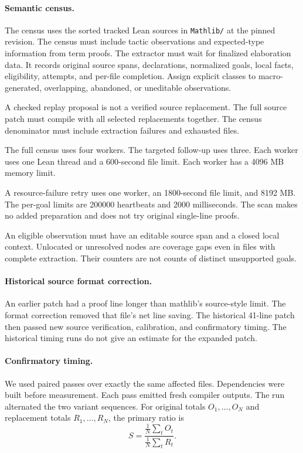\paragraph{Semantic census.}
The census uses the sorted tracked Lean sources in \texttt{Mathlib/} at the pinned revision.
The census must include tactic observations and expected-type information from term proofs.
The extractor must wait for finalized elaboration data.
It records original source spans, declarations, normalized goals, local facts, eligibility, attempts, and per-file completion.
Assign explicit classes to macro-generated, overlapping, abandoned, or uneditable observations.

A checked replay proposal is not a verified source replacement.
The full source patch must compile with all selected replacements together.
The census denominator must include extraction failures and exhausted files.

The full census uses four workers.
The targeted follow-up uses three.
Each worker uses one Lean thread and a 600-second file limit.
Each worker has a 4096 MB memory limit.

A resource-failure retry uses one worker, an 1800-second file limit, and 8192 MB.
The per-goal limits are 200000 heartbeats and 2000 milliseconds.
The scan makes no added preparation and does not try original single-line proofs.

An eligible observation must have an editable source span and a closed local context.
Unlocated or unresolved nodes are coverage gaps even in files with complete extraction.
Their counters are not counts of distinct unsupported goals.



\paragraph{Historical source format correction.}
An earlier patch had a proof line longer than mathlib's source-style limit.
The format correction removed that file's net line saving.
The historical 41-line patch then passed new source verification, calibration, and confirmatory timing.
The historical timing runs do not give an estimate for the expanded patch.

\paragraph{Confirmatory timing.}
We used paired passes over exactly the same affected files.
Dependencies were built before measurement.
Each pass emitted fresh compiler outputs.
The run alternated the two variant sequences.
For original totals $O_1,\ldots,O_N$ and replacement totals $R_1,\ldots,R_N$, the primary ratio is
\[
 S=\frac{\frac1N\sum_tO_t}{\frac1N\sum_tR_t}.
\]

